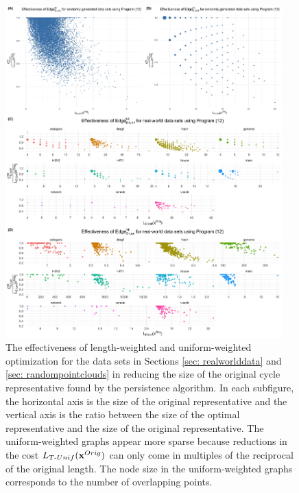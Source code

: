 \newpage 
\begin{figure}[h!]
\begin{center}
\includegraphics[width=0.95\textwidth]{figures/four_eff_df.jpg} 
\end{center}
\caption{The effectiveness of length-weighted and uniform-weighted optimization for the data sets in Sections \ref{sec: realworlddata} and \ref{sec: randompointclouds} in reducing the size of the original cycle representative found by the persistence algorithm. In each subfigure, the horizontal axis is the size of the original representative and the vertical axis is the ratio between the size of the optimal representative and the size of the original representative. The uniform-weighted graphs appear more sparse because reductions in the cost $L_{T\text{-}Unif}(\mathbf{x}^{Orig})$ can only come in multiples of the reciprocal of the original length. The node size in the uniform-weighted graphs corresponds to the number of overlapping points. %
}\label{fig:effectivenessall} 
\end{figure}

